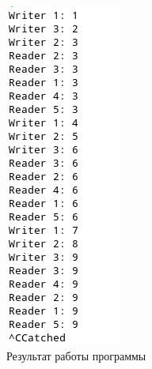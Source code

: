 \documentclass[14pt, a4paper]{extarticle}
\begin{document}
\begin{figure}[h!]
	\centering
	\includegraphics[scale=1]{source/2.png}
	\caption{Результат работы программы}
	\label{Example2}
\end{figure}\par
\end{document}
